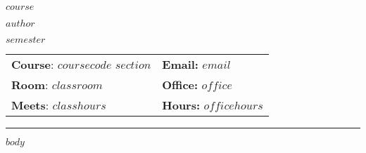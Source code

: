 \documentclass{article}
\begin{document}
\sffamily

\centerline{\Huge $course$}

\vspace{3 mm}

\centerline{\large $author$}
\vspace{2 mm}
\centerline{\large $semester$}

\vspace{5 mm}

\begin{tabular}{@{}p{3.5in}p{3.5in}}           
\textbf{Course}: $coursecode$ $section$ & \textbf{Email:}  $email$\\
\textbf{Room}: $classroom$ & \textbf{Office:}  $office$\\
\textbf{Meets}: $classhours$ & \textbf{Hours:} $officehours$\\ 
\end{tabular}

\vspace{5 mm}

\hrule


$body$
\end{document}
